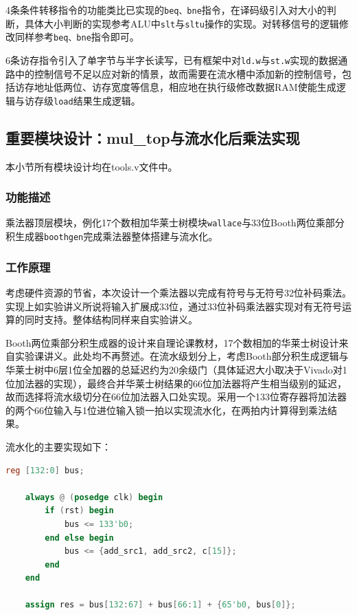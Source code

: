 \documentclass[UTF-8,twoside,c5size]{ctexart}
\begin{document}
	4条条件转移指令的功能类比已实现的\texttt{beq、bne}指令，在译码级引入对大小的判断，具体大小判断的实现参考ALU中\texttt{slt}与\texttt{sltu}操作的实现。对转移信号的逻辑修改同样参考\texttt{beq、bne}指令即可。
	
	6条访存指令引入了单字节与半字长读写，已有框架中对\texttt{ld.w}与\texttt{st.w}实现的数据通路中的控制信号不足以应对新的情景，故而需要在流水槽中添加新的控制信号，包括访存地址低两位、访存宽度等信息，相应地在执行级修改数据RAM使能生成逻辑与访存级\texttt{load}结果生成逻辑。
	
	\subsection{重要模块设计：mul\_top与流水化后乘法实现}
	本小节所有模块设计均在tools.v文件中。
	\subsubsection{功能描述}
	
	乘法器顶层模块，例化17个数相加华莱士树模块\texttt{wallace}与33位Booth两位乘部分积生成器\texttt{boothgen}完成乘法器整体搭建与流水化。
	
	\subsubsection{工作原理}
	
	考虑硬件资源的节省，本次设计一个乘法器以完成有符号与无符号32位补码乘法。实现上如实验讲义所说将输入扩展成33位，通过33位补码乘法器实现对有无符号运算的同时支持。整体结构同样来自实验讲义。
	
	Booth两位乘部分积生成器的设计来自理论课教材，17个数相加的华莱士树设计来自实验课讲义。此处均不再赘述。在流水级划分上，考虑Booth部分积生成逻辑与华莱士树中6层1位全加器的总延迟约为20余级门（具体延迟大小取决于Vivado对1位加法器的实现），最终合并华莱士树结果的66位加法器将产生相当级别的延迟，故而选择将流水级切分在66位加法器入口处实现。采用一个133位寄存器将加法器的两个66位输入与1位进位输入锁一拍以实现流水化，在两拍内计算得到乘法结果。
	
	流水化的主要实现如下：
	\begin{lstlisting}[language=verilog]
	reg [132:0] bus;
	
	always @ (posedge clk) begin
		if (rst) begin
			bus <= 133'b0;
		end else begin
			bus <= {add_src1, add_src2, c[15]};
		end
	end
	
	assign res = bus[132:67] + bus[66:1] + {65'b0, bus[0]};\end{lstlisting}
	
\end{document}
